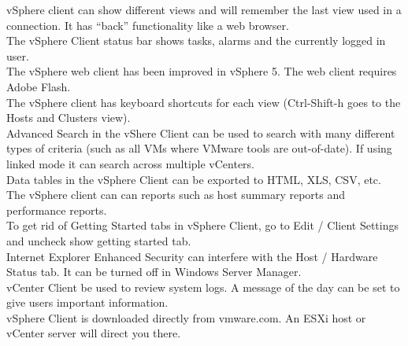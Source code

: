 vSphere client can show different views and will remember the last view used
in a connection. It has ``back'' functionality like a web browser.\\

The vSphere Client status bar shows tasks, alarms and the currently logged in
user.\\

The vSphere web client has been improved in vSphere 5. The web client requires Adobe Flash.\\

The vSphere client has keyboard shortcuts for each view (Ctrl-Shift-h goes to
the Hosts and Clusters view).\\

Advanced Search in the vShere Client can be used to search with many different
types of criteria (such as all VMs where VMware tools are out-of-date). If
using linked mode it can search across multiple vCenters.\\

Data tables in the vSphere Client can be exported to HTML, XLS, CSV, etc.\\

The vSphere client can can reports such as host summary reports and performance
reports.\\

To get rid of Getting Started tabs in vSphere Client, go to
Edit / Client Settings and uncheck show getting started tab.\\

Internet Explorer Enhanced Security can interfere with the Host / Hardware
Status tab. It can be turned off in Windows Server Manager.\\

vCenter Client be used to review system logs. A message of the day can be set
to give users important information.\\

vSphere Client is downloaded directly from vmware.com. An ESXi host or vCenter server
will direct you there.
